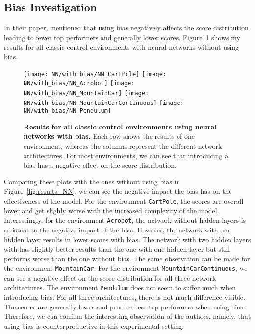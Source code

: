 \subsection{Bias Investigation}
In their paper, \citet{oller_analyzing_2020} mentioned that using bias negatively affects the score distribution leading to fewer top performers and generally lower scores. Figure~\ref{fig:results_NN_bias} shows my results for all classic control environments with neural networks without using bias.
\begin{figure}[!ht]
  \centering
\texttt{[image: NN/with\_bias/NN\_CartPole]}
\texttt{[image: NN/with\_bias/NN\_Acrobot]}
\texttt{[image: NN/with\_bias/NN\_MountainCar]}
\texttt{[image: NN/with\_bias/NN\_MountainCarContinuous]}
\texttt{[image: NN/with\_bias/NN\_Pendulum]}
\caption[Results for all classic control environments using neural networks with bias]{
  \textbf{Results for all classic control environments using neural networks with bias.}
   Each row shows the results of one environment, whereas the columns represent the different network architectures. For most environments, we can see that introducing a bias has a negative effect on the score distribution.
}
\label{fig:results_NN_bias}
\end{figure}
Comparing these plots with the ones without using bias in Figure~\ref{fig:results_NN}, we can see the negative impact the bias has on the effectiveness of the model. For the environment \verb|CartPole|, the scores are overall lower and get slighly worse with the increased complexity of the model. Interestingly, for the environment \verb|Acrobot|, the network without hidden layers is resistent to the negative impact of the bias. However, the network with one hidden layer results in lower scores with bias. The network with two hidden layers with has slightly better results than the one with one hidden layer but still performs worse than the one without bias. The same observation can be made for the environment \verb|MountainCar|. For the environment \verb|MountainCarContinuous|, we can see a negative effect on the score distribution for all three network architectures. The environment \verb|Pendulum| does not seem to suffer much when introducing bias. For all three architectures, there is not much difference visible. The scores are generally lower and produce less top performers when using bias. Therefore, we can confirm the interesting observation of the authors, namely, that using bias is counterproductive in this experimental setting.


